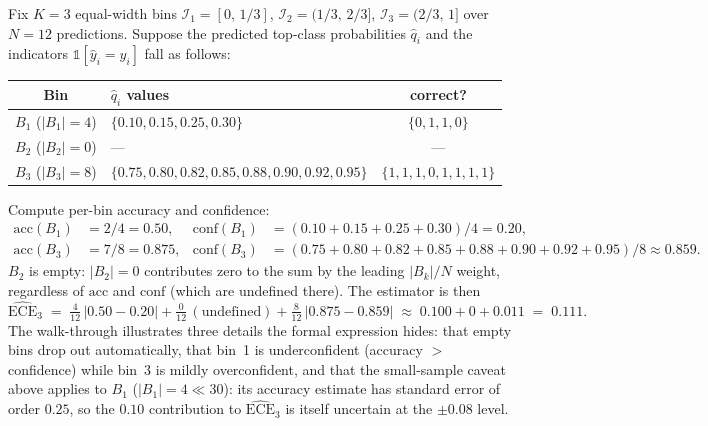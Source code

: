 \begin{workedexample}
Fix $K = 3$ equal-width bins
$\mathcal{I}_1 = [0,\,1/3]$, $\mathcal{I}_2 = (1/3,\,2/3]$,
$\mathcal{I}_3 = (2/3,\,1]$ over $N=12$ predictions. Suppose the
predicted top-class probabilities $\hat q_i$ and the indicators
$\mathbb{1}[\hat y_i = y_i]$ fall as follows:
\begin{center}
\small
\begin{tabular}{|c|l|c|}
\hline
Bin & $\hat q_i$ values & correct? \\
\hline
$B_1$ ($|B_1|=4$) & $\{0.10, 0.15, 0.25, 0.30\}$ & $\{0,1,1,0\}$ \\
$B_2$ ($|B_2|=0$) & --- & --- \\
$B_3$ ($|B_3|=8$) & $\{0.75, 0.80, 0.82, 0.85, 0.88, 0.90, 0.92, 0.95\}$ & $\{1,1,1,0,1,1,1,1\}$ \\
\hline
\end{tabular}
\end{center}
Compute per-bin accuracy and confidence:
\begin{align*}
\mathrm{acc}(B_1) &= 2/4 = 0.50, &
\mathrm{conf}(B_1) &= (0.10+0.15+0.25+0.30)/4 = 0.20, \\
\mathrm{acc}(B_3) &= 7/8 = 0.875, &
\mathrm{conf}(B_3) &= (0.75+0.80+0.82+0.85+0.88+0.90+0.92+0.95)/8 \approx 0.859.
\end{align*}
$B_2$ is empty: $|B_2| = 0$ contributes zero to the sum by the
leading $|B_k|/N$ weight, regardless of $\mathrm{acc}$ and
$\mathrm{conf}$ (which are undefined there). The estimator is then
\[
\widehat{\mathrm{ECE}}_3
  \;=\; \tfrac{4}{12}\,|0.50 - 0.20|
        + \tfrac{0}{12}\,(\text{undefined})
        + \tfrac{8}{12}\,|0.875 - 0.859|
  \;\approx\; 0.100 + 0 + 0.011
  \;=\; 0.111.
\]
The walk-through illustrates three details the formal expression
hides: that empty bins drop out automatically, that bin~1 is
underconfident (accuracy $>$ confidence) while bin~3 is mildly
overconfident, and that the small-sample caveat above applies to
$B_1$ ($|B_1|=4 \ll 30$): its accuracy estimate has standard error
of order $0.25$, so the $0.10$ contribution to $\widehat{\mathrm{ECE}}_3$
is itself uncertain at the $\pm 0.08$ level.
\end{workedexample}

